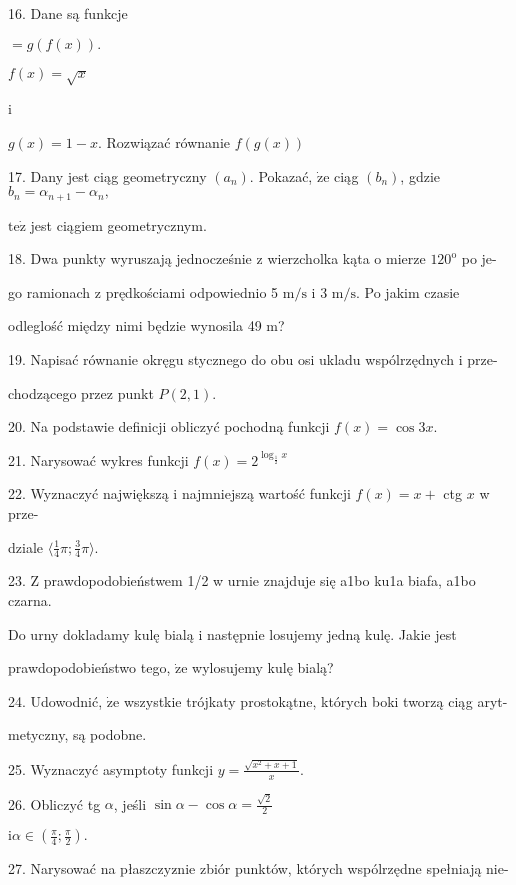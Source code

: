 \documentclass[a4paper,12pt]{article}
\begin{document}
16. Dane są funkcje

$= g(f(x)).$

$f(x)=\sqrt{x}$

i

$g(x)=1-x$. Rozwiązać równanie $f(g(x))$

17. Dany jest ciąg geometryczny $(a_{n})$. Pokazać, $\dot{\mathrm{z}}\mathrm{e}$ ciąg $(b_{n})$, gdzie $b_{n}=\alpha_{n+1}-\alpha_{n},$

$\mathrm{t}\mathrm{e}\dot{\mathrm{z}}$ jest ciągiem geometrycznym.

18. Dwa punkty wyruszają jednocześnie z wierzcholka kąta o mierze $120^{\mathrm{o}}$ po je-

go ramionach z prędkościami odpowiednio 5 $\mathrm{m}/\mathrm{s}$ i 3 $\mathrm{m}/\mathrm{s}$. Po jakim czasie

odleglość między nimi będzie wynosila 49 $\mathrm{m}$?

19. Napisać równanie okręgu stycznego do obu osi ukladu wspólrzędnych i prze-

chodzącego przez punkt $P(2,1).$

20. Na podstawie definicji obliczyć pochodną funkcji $f(x)=\cos 3x.$

21. Narysować wykres funkcji $f(x)=2^{\log_{\frac{1}{2}}x}$

22. Wyznaczyć największą i najmniejszą wartość funkcji $f(x)=x+$ ctg $x$ w prze-

dziale $\displaystyle \langle\frac{1}{4}\pi;\frac{3}{4}\pi\rangle.$

23. $\mathrm{Z}$ prawdopodobieństwem 1/2 w urnie znajduje się a1bo ku1a biafa, a1bo czarna.

Do urny dokladamy kulę bialą i następnie losujemy jedną kulę. Jakie jest

prawdopodobieństwo tego, $\dot{\mathrm{z}}\mathrm{e}$ wylosujemy kulę bialą?

24. Udowodnić, $\dot{\mathrm{z}}\mathrm{e}$ wszystkie trójkaty prostokątne, których boki tworzą ciąg aryt-

metyczny, są podobne.

25. Wyznaczyć asymptoty funkcji $y=\displaystyle \frac{\sqrt{x^{2}+x+1}}{x}.$

26. Obliczyć tg $\alpha$, jeśli $\displaystyle \sin\alpha-\cos\alpha=\frac{\sqrt{2}}{2}$

$\mathrm{i} \displaystyle \alpha\in(\frac{\pi}{4};\frac{\pi}{2}).$

27. Narysować na płaszczyz$\acute{}$nie zbiór punktów, których wspólrzędne spełniają nie-
\end{document}
